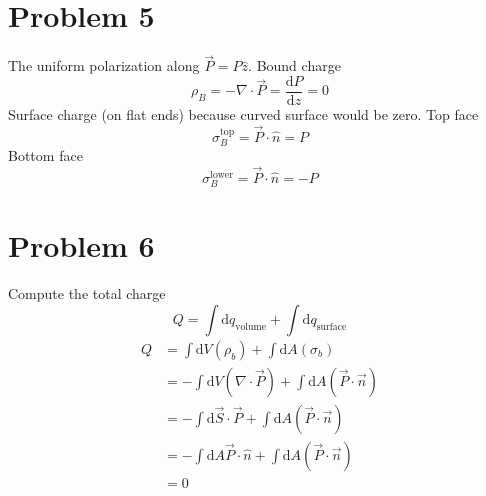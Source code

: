 \documentclass[letter, 10pts]{article}
\begin{document}
\section*{Problem 5} 
The uniform polarization along $\vec{P} = P \hat{z}$. 
Bound charge 
\[
\rho_B = - \nabla \cdot  \vec{P} = \frac{\mathrm{d} P}{\mathrm{d}z } = 0
\] 
Surface charge (on flat ends) because curved surface would be zero. Top face
\[
\sigma^{\text{top}}_B = \vec{P} \cdot \hat{n} = P
\]
Bottom face
\[
\sigma^{\text{lower}}_B = \vec{P} \cdot  \hat{n} = -P 
\] 

















\section*{Problem 6} 
Compute the total charge
\[
	Q = \int \mathrm{d} q_{\text{volume}}  + \int \mathrm{d} q_{\text{surface}} 
\]
\begin{align*}
Q &= 
\int \mathrm{d} V (\rho_b) + 
\int \mathrm{d} A (\sigma_b) \\
  &=
- \int \mathrm{d} V (\nabla \cdot \vec{P}) + 
\int \mathrm{d} A (\vec{P} \cdot \vec{n})\\
&= -  \int \mathrm{d} \vec{S} \cdot  \vec{P} + 
\int \mathrm{d} A (\vec{P} \cdot \vec{n})\\
&= - \int \mathrm{d} A  \vec{P} \cdot \hat{n} + 
\int \mathrm{d} A (\vec{P} \cdot \vec{n})\\ 
&= 0 \\
\end{align*}
\end{document}
